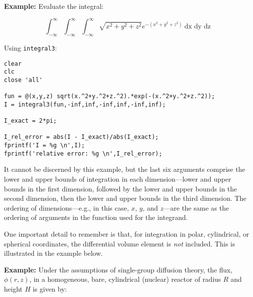 \vspace{0.25cm}

\noindent\textbf{Example:} Evaluate the integral:

\begin{equation*}
\int_{-\infty}^{\infty} \int_{-\infty}^{\infty} \int_{-\infty}^{\infty} \sqrt{x^2 + y^2 + z^2}e^{-\left(x^2 + y^2 + z^2\right)} \ \text{dx dy dz}
\end{equation*}

Using \lstinline[style=myMatlab]{integral3}:
\begin{lstlisting}[style=myMatlab,name=lec22n-ex3]
clear
clc
close 'all'

fun = @(x,y,z) sqrt(x.^2+y.^2+z.^2).*exp(-(x.^2+y.^2+z.^2));
I = integral3(fun,-inf,inf,-inf,inf,-inf,inf);

I_exact = 2*pi;

I_rel_error = abs(I - I_exact)/abs(I_exact);
fprintf('I = %g \n',I);
fprintf('relative error: %g \n',I_rel_error);
\end{lstlisting}

\noindent It cannot be discerned by this example, but the last six arguments comprise the lower and upper bounds of integration in each dimension---lower and upper bounds in the first dimension, followed by the lower and upper bounds in the second dimension, then the lower and upper bounds in the third dimension.  The ordering of dimensions---e.g., in this case, $x$, $y$, and $z$---are the same as the ordering of arguments in the function used for the integrand.  

One important detail to remember is that, for integration in polar, cylindrical, or spherical coordinates, the differential volume element is \emph{not} included.  This is illustrated in the example below.

\vspace{0.25cm}

\noindent\textbf{Example:} Under the assumptions of single-group diffusion theory, the flux, $\phi(r,z)$, in a homogeneous, bare, cylindrical (nuclear) reactor of radius $R$ and height $H$ is given by:

